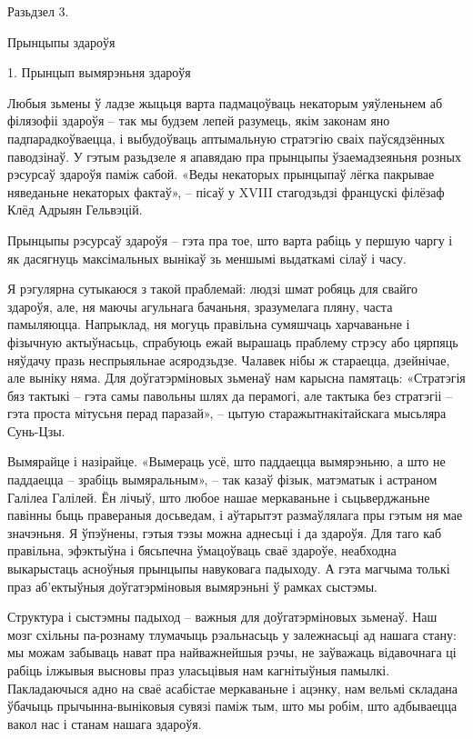Разьдзел 3. 

Прынцыпы здароўя

1. Прынцып вымярэньня здароўя

Любыя зьмены ў ладзе жыцьця варта падмацоўваць некаторым уяўленьнем аб філязофіі здароўя – так мы будзем лепей разумець, якім законам яно падпарадкоўваецца, і выбудоўваць аптымальную стратэгію сваіх паўсядзённых паводзінаў. У гэтым разьдзеле я апавядаю пра прынцыпы ўзаемадзеяньня розных рэсурсаў здароўя паміж сабой. «Веды некаторых прынцыпаў лёгка пакрывае няведаньне некаторых фактаў», – пісаў у XVIII стагодзьдзі францускі філёзаф Клёд Адрыян Гельвэцій.

Прынцыпы рэсурсаў здароўя – гэта пра тое, што варта рабіць у першую чаргу і як дасягнуць максімальных вынікаў зь меншымі выдаткамі сілаў і часу.

Я рэгулярна сутыкаюся з такой праблемай: людзі шмат робяць для свайго здароўя, але, ня маючы агульнага бачаньня, зразумелага пляну, часта памыляюцца. Напрыклад, ня могуць правільна сумяшчаць харчаваньне і фізычную актыўнасьць, спрабуюць ежай вырашаць праблему стрэсу або цярпяць няўдачу празь неспрыяльнае асяродзьдзе. Чалавек нібы ж стараецца, дзейнічае, але выніку няма. Для доўгатэрміновых зьменаў нам карысна памятаць: «Стратэгія бяз тактыкі – гэта самы павольны шлях да перамогі, але тактыка без стратэгіі – гэта проста мітусьня перад паразай», – цытую старажытнакітайскага мысьляра Сунь-Цзы.

Вымярайце і назірайце. «Вымераць усё, што паддаецца вымярэньню, а што не паддаецца – зрабіць вымяральным», – так казаў фізык, матэматык і астраном Галілеа Галілей. Ён лічыў, што любое нашае меркаваньне і сьцьверджаньне павінны быць правераныя досьведам, і аўтарытэт размаўлялага пры гэтым ня мае значэньня. Я ўпэўнены, гэтыя тэзы можна аднесьці і да здароўя. Для таго каб правільна, эфэктыўна і бясьпечна ўмацоўваць сваё здароўе, неабходна выкарыстаць асноўныя прынцыпы навуковага падыходу. А гэта магчыма толькі праз аб'ектыўныя доўгатэрміновыя вымярэньні ў рамках сыстэмы.

Структура і сыстэмны падыход – важныя для доўгатэрміновых зьменаў. Наш мозг схільны па-рознаму тлумачыць рэальнасьць у залежнасьці ад нашага стану: мы можам забываць нават пра найважнейшыя рэчы, не заўважаць відавочнага ці рабіць ілжывыя высновы праз уласьцівыя нам кагнітыўныя памылкі. Пакладаючыся адно на сваё асабістае меркаваньне і ацэнку, нам вельмі складана ўбачыць прычынна-выніковыя сувязі паміж тым, што мы робім, што адбываецца вакол нас і станам нашага здароўя.

